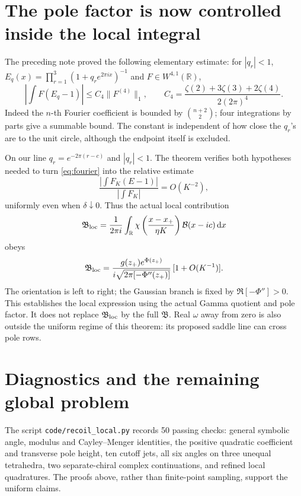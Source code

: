 \documentclass[11pt,a4paper]{article}
\newcommand{\dd}{\mathop{}\!\mathrm d}
\begin{document}
\section{The pole factor is now controlled inside the local integral}
The preceding note proved the following elementary estimate:
for \(|q_r|<1\), \(E_q(x)=\prod_{r=1}^3(1+q_re^{2\pi ix})^{-1}\)
and \(F\in W^{4,1}(\mathbb R)\),
\begin{equation}
 \left|\int F(E_q-1)\right|\le
 C_4\|F^{(4)}\|_1,\qquad
 C_4=\frac{\zeta(2)+3\zeta(3)+2\zeta(4)}{2(2\pi)^4}.
 \label{eq:fourier}
\end{equation}
Indeed the \(n\)-th Fourier coefficient is bounded by
\(\binom{n+2}{2}\); four integrations by parts give a summable bound.
The constant is independent of how close the \(q_r\)'s are to the
unit circle, although the endpoint itself is excluded.

On our line \(q_r=e^{-2\pi(r-c)}\) and \(|q_r|<1\).
The theorem verifies both hypotheses needed to turn
\eqref{eq:fourier} into the relative estimate
\begin{equation}
 \frac{\left|\int F_K(E-1)\right|}
 {\left|\int F_K\right|}=O(K^{-2}),
 \label{eq:poleerror}
\end{equation}
uniformly even when \(\delta\downarrow0\).
Thus the actual local contribution
\[
 \mathfrak B_{\rm loc}=\frac1{2\pi i}\int_{\mathbb R}
 \chi\left(\frac{x-x_+}{\eta K}\right)
 \mathcal B(x-ic)\dd x
\]
obeys
\begin{equation}
 \mathfrak B_{\rm loc}=
 \frac{g(z_+)e^{\Phi(z_+)}}
 {i\sqrt{2\pi[-\Phi''(z_+)]}}\,[1+O(K^{-1})].
 \label{eq:localresult}
\end{equation}
The orientation is left to right; the Gaussian branch is fixed by
\(\Re[-\Phi'']>0\).
This establishes the local expression using the actual Gamma
quotient and pole factor. It does not replace
\(\mathfrak B_{\rm loc}\) by the full \(\mathfrak B\).
Real \(\omega\) away from zero is also outside the uniform regime
of this theorem: its proposed saddle line can cross pole rows.

\section{Diagnostics and the remaining global problem}
The script \texttt{code/recoil\_local.py} records 50 passing checks:
general symbolic angle, modulus and Cayley--Menger identities, the
positive quadratic coefficient and transverse pole height, ten cutoff jets,
all six angles on three unequal tetrahedra, two separate-chiral
complex continuations, and refined local quadratures.
The proofs above, rather than finite-point sampling, support
the uniform claims.
\end{document}
